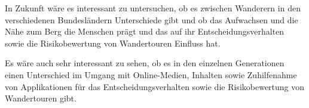 In Zukunft wäre es interessant zu untersuchen, ob es zwischen Wanderern in den verschiedenen Bundesländern Unterschiede gibt und ob das Aufwachsen und die Nähe zum Berg die Menschen prägt und das auf ihr Entscheidungsverhalten sowie die Risikobewertung von Wandertouren Einfluss hat.

Es wäre auch sehr interessant zu sehen, ob es in den einzelnen Generationen einen Unterschied im Umgang mit Online-Medien, Inhalten sowie Zuhilfenahme von Applikationen für das Entscheidungsverhalten sowie die Risikobewertung von Wandertouren gibt.









